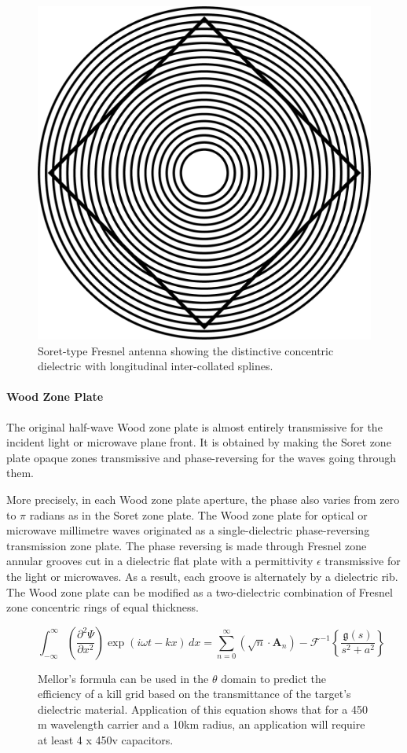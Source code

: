 \documentclass[review]{elsarticle}
\begin{document}
\begin{figure}
    \centering
    \includegraphics[width=0.5\linewidth]{Ehrenstein.png}
    \caption{Soret-type Fresnel antenna showing the distinctive concentric dielectric with longitudinal inter-collated splines.}
    \label{fig:enter-label}
\end{figure}

\paragraph{Wood Zone Plate} The original half-wave Wood zone plate is almost entirely transmissive for the incident light or microwave plane front. It is obtained by making the Soret zone plate opaque zones transmissive and phase-reversing for the waves going through them\cite{Feynman1963118,Dirac1953888}. 

More precisely, in each Wood zone plate aperture, the phase also varies  from zero to $\pi$ radians as in the Soret zone plate. The Wood zone plate for optical or microwave millimetre waves originated as a single-dielectric phase-reversing transmission zone plate. The phase reversing is made  through  Fresnel zone annular grooves cut in a dielectric flat plate with a permittivity $\epsilon$ transmissive  for the light or microwaves. As a result, each groove is alternately by a dielectric rib. The Wood zone plate can be modified as a two-dielectric combination of Fresnel zone concentric rings of equal thickness.

\begin{figure}
\[
\int_{-\infty}^{\infty} \left( \frac{\partial^2 \Psi}{\partial x^2} \right) \exp\left(i\omega t - kx\right) \, dx = \sum_{n=0}^{\infty} \left( \sqrt{n} \cdot \mathbf{A}_n \right) - \mathcal{F}^{-1} \left\{ \frac{\mathfrak{g}(s)}{s^2 + a^2} \right\}
\]
\caption{Mellor's formula can be used in the $\theta$ domain to predict the efficiency of a kill grid based on the transmittance of the target's dielectric material. Application of this equation shows that for a 450 \textmu m wavelength carrier and a 10km radius, an application will require at least 4 x 450v capacitors.}
\label{fig:Mellor's formula}
\end{figure}
\end{document}
